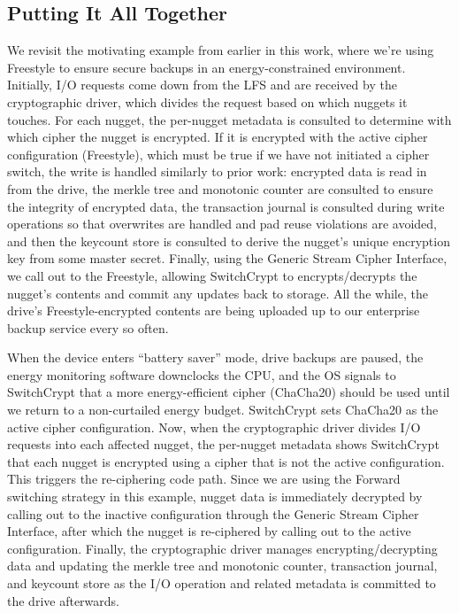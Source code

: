 

\subsection{Putting It All Together} \label{subsec:summary}

We revisit the motivating example from earlier in this work, where we're using
Freestyle to ensure secure backups in an energy-constrained environment.
Initially, I/O requests come down from the LFS and are received by the
cryptographic driver, which divides the request based on which nuggets it
touches. For each nugget, the per-nugget metadata is consulted to determine with
which cipher the nugget is encrypted. If it is encrypted with the active cipher
configuration (Freestyle), which must be true if we have not initiated a cipher
switch, the write is handled similarly to prior work: encrypted data is read in
from the drive, the merkle tree and monotonic counter are consulted to ensure
the integrity of encrypted data, the transaction journal is consulted during
write operations so that overwrites are handled and pad reuse violations are
avoided, and then the keycount store is consulted to derive the nugget's unique
encryption key from some master secret. Finally, using the Generic Stream Cipher
Interface, we call out to the Freestyle, allowing SwitchCrypt to
encrypts/decrypts the nugget's contents and commit any updates back to storage.
All the while, the drive's Freestyle-encrypted contents are being uploaded up to
our enterprise backup service every so often.

When the device enters ``battery saver'' mode, drive backups are paused, the
energy monitoring software downclocks the CPU, and the OS signals to SwitchCrypt
that a more energy-efficient cipher (ChaCha20) should be used until we return to
a non-curtailed energy budget. SwitchCrypt sets ChaCha20 as the active cipher
configuration. Now, when the cryptographic driver divides I/O requests into each
affected nugget, the per-nugget metadata shows SwitchCrypt that each nugget is
encrypted using a cipher that is not the active configuration. This triggers the
re-ciphering code path. Since we are using the Forward switching strategy in
this example, nugget data is immediately decrypted by calling out to the
inactive configuration through the Generic Stream Cipher Interface, after which
the nugget is re-ciphered by calling out to the active configuration. Finally,
the cryptographic driver manages encrypting/decrypting data and updating the
merkle tree and monotonic counter, transaction journal, and keycount store as
the I/O operation and related metadata is committed to the drive afterwards.

